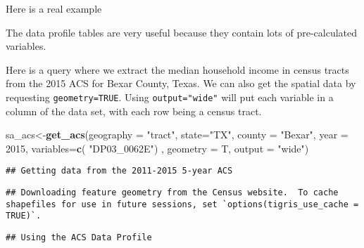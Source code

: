 \documentclass[]{article}
\newenvironment{Shaded}{\begin{snugshade}}{\end{snugshade}}
\newcommand{\KeywordTok}[1]{\textcolor[rgb]{0.13,0.29,0.53}{\textbf{#1}}}
\newcommand{\DataTypeTok}[1]{\textcolor[rgb]{0.13,0.29,0.53}{#1}}
\newcommand{\DecValTok}[1]{\textcolor[rgb]{0.00,0.00,0.81}{#1}}
\newcommand{\StringTok}[1]{\textcolor[rgb]{0.31,0.60,0.02}{#1}}
\newcommand{\CommentTok}[1]{\textcolor[rgb]{0.56,0.35,0.01}{\textit{#1}}}
\newcommand{\OperatorTok}[1]{\textcolor[rgb]{0.81,0.36,0.00}{\textbf{#1}}}
\newcommand{\NormalTok}[1]{#1}
\begin{document}
Here is a real example

The data profile tables are very useful because they contain lots of
pre-calculated variables.

Here is a query where we extract the median household income in census
tracts from the 2015 ACS for Bexar County, Texas. We can also get the
spatial data by requesting \texttt{geometry=TRUE}. Using
\texttt{output="wide"} will put each variable in a column of the data
set, with each row being a census tract.

\begin{Shaded}
\begin{Highlighting}[]
\NormalTok{sa_acs<-}\KeywordTok{get_acs}\NormalTok{(}\DataTypeTok{geography =} \StringTok{"tract"}\NormalTok{, }\DataTypeTok{state=}\StringTok{"TX"}\NormalTok{, }\DataTypeTok{county =} \StringTok{"Bexar"}\NormalTok{,}
                \DataTypeTok{year =} \DecValTok{2015}\NormalTok{,}
                \DataTypeTok{variables=}\KeywordTok{c}\NormalTok{( }\StringTok{"DP03_0062E"}\NormalTok{) ,}
                \DataTypeTok{geometry =}\NormalTok{ T, }\DataTypeTok{output =} \StringTok{"wide"}\NormalTok{)}
\end{Highlighting}
\end{Shaded}

\begin{verbatim}
## Getting data from the 2011-2015 5-year ACS
\end{verbatim}

\begin{verbatim}
## Downloading feature geometry from the Census website.  To cache shapefiles for use in future sessions, set `options(tigris_use_cache = TRUE)`.
\end{verbatim}

\begin{verbatim}
## Using the ACS Data Profile
\end{verbatim}

\begin{Shaded}
\end{Shaded}
\end{document}
